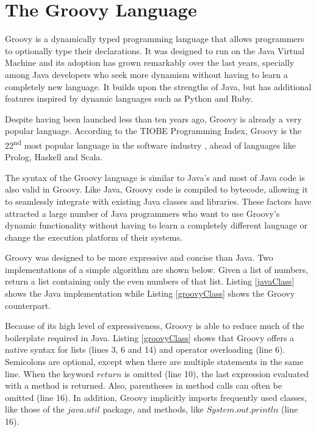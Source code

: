 \documentclass[preprint]{sigplanconf}
\begin{document}
%
%

\section{The Groovy Language\label{groovy}}

Groovy is a dynamically typed programming language that allows programmers to optionally type their declarations.
It was designed to run on the Java Virtual Machine and its adoption has grown remarkably over the last years, specially among Java developers who seek more dynamism without having to learn a completely new language.
It builds upon the strengths of Java, but has additional features inspired by dynamic languages such as Python and Ruby.

Despite having been launched less than ten years ago, Groovy is already a very popular language.
According to the TIOBE Programming Index, Groovy is the 22\textsuperscript{nd} most popular language in the software industry \cite{tiobe}, ahead of languages like Prolog, Haskell and Scala. 

The syntax of the Groovy language is similar to Java's and most of Java code is also valid in Groovy.
Like Java, Groovy code is compiled to bytecode, allowing it to seamlessly integrate with existing Java classes and libraries. 
These factors have attracted a large number of Java programmers who want to use Groovy's dynamic functionality without having to learn a completely different language or change the execution platform of their systems. 

Groovy was designed to be more expressive and concise than Java.
Two implementations of a simple algorithm are shown below.
Given a list of numbers, return a list containing only the even numbers of that list.
Listing \ref{javaClass} shows the Java implementation while Listing \ref{groovyClass} shows the Groovy counterpart. 

Because of its high level of expressiveness, Groovy is able to reduce much of the boilerplate required in Java.
Listing \ref{groovyClass} shows that Groovy offers a native syntax for lists (lines 3, 6 and 14) and operator overloading (line 6). 
Semicolons are optional, except when there are multiple statements in the same line. 
When the keyword $return$ is omitted (line 10), the last expression evaluated with a method is returned. 
Also, parentheses in method calls can often be omitted (line 16).
In addition, Groovy implicitly imports frequently used classes, like those of the $java.util$ package, and methods, like $System.out.println$ (line 16).
\end{document}
